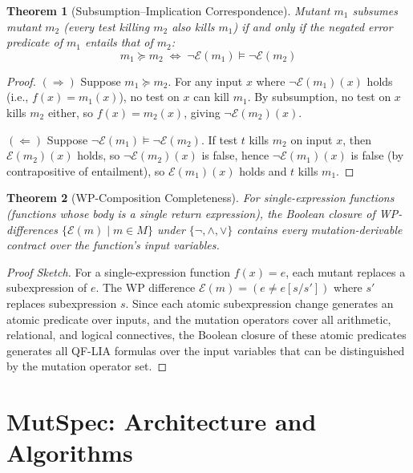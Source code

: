 \documentclass[11pt]{article}
\newtheorem{theorem}{Theorem}
\begin{document}
\begin{theorem}[Subsumption--Implication Correspondence]
\label{thm:subsumption}
Mutant $m_1$ subsumes mutant $m_2$ (every test killing $m_2$ also kills $m_1$)
if and only if the negated error predicate of $m_1$ entails that of $m_2$:
\[
  m_1 \succcurlyeq m_2 \;\iff\; \neg\mathcal{E}(m_1) \models \neg\mathcal{E}(m_2)
\]
\end{theorem}

\begin{proof}
$(\Rightarrow)$ Suppose $m_1 \succcurlyeq m_2$. For any input $x$ where
$\neg\mathcal{E}(m_1)(x)$ holds (i.e., $f(x) = m_1(x)$), no test on $x$ can
kill $m_1$. By subsumption, no test on $x$ kills $m_2$ either, so
$f(x) = m_2(x)$, giving $\neg\mathcal{E}(m_2)(x)$.

$(\Leftarrow)$ Suppose $\neg\mathcal{E}(m_1) \models \neg\mathcal{E}(m_2)$. If
test $t$ kills $m_2$ on input $x$, then $\mathcal{E}(m_2)(x)$ holds, so
$\neg\mathcal{E}(m_2)(x)$ is false, hence $\neg\mathcal{E}(m_1)(x)$ is false
(by contrapositive of entailment), so $\mathcal{E}(m_1)(x)$ holds and $t$ kills
$m_1$.
\end{proof}

\begin{theorem}[WP-Composition Completeness]
\label{thm:wp-composition}
For single-expression functions (functions whose body is a single return
expression), the Boolean closure of WP-differences
$\{\mathcal{E}(m) \mid m \in M\}$ under $\{\neg, \land, \lor\}$ contains every
mutation-derivable contract over the function's input variables.
\end{theorem}

\begin{proof}[Proof Sketch]
For a single-expression function $f(x) = e$, each mutant replaces a subexpression
of $e$. The WP difference $\mathcal{E}(m) = (e \neq e[s/s'])$ where $s'$
replaces subexpression $s$. Since each atomic subexpression change generates an
atomic predicate over inputs, and the mutation operators cover all arithmetic,
relational, and logical connectives, the Boolean closure of these atomic
predicates generates all QF-LIA formulas over the input variables that can be
distinguished by the mutation operator set.
\end{proof}

\section{MutSpec: Architecture and Algorithms}
\label{sec:architecture}
\end{document}
